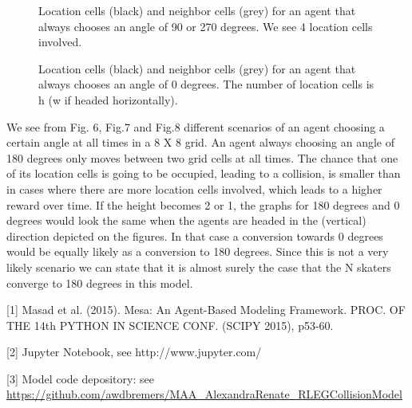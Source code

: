 \documentclass[a4paper]{article}
\begin{document}
\begin{figure}[h]
\caption{Location cells (black) and neighbor cells (grey) for an agent that always chooses an angle of 90 or 270 degrees. We see 4 location cells involved.} 
\end{figure}

\begin{figure}[h]
\caption{Location cells (black) and neighbor cells (grey) for an agent that always chooses an angle of 0 degrees. The number of location cells is h (w if headed horizontally).} 
\end{figure}

We see from Fig. 6, Fig.7 and Fig.8 different scenarios of an agent choosing a certain angle at all times in a 8 X 8 grid. An agent always choosing an angle of 180 degrees only moves between two grid cells at all times. The chance that one of its location cells is going to be occupied, leading to a collision, is smaller than in cases where there are more location cells involved, which leads to a higher reward over time.
If the height becomes 2 or 1, the graphs for 180 degrees and 0 degrees would look the same when the agents are headed in the (vertical) direction depicted on the figures. In that case a conversion towards 0 degrees would be equally likely as a conversion to 180 degrees. Since this is not a very likely scenario we can state that it is almost surely the case that the N skaters converge to 180 degrees in this model.





[1] Masad et al. (2015). Mesa: An Agent-Based Modeling Framework. PROC. OF THE 14th PYTHON IN SCIENCE CONF. (SCIPY 2015), p53-60.
\newline

[2] Jupyter Notebook, see http://www.jupyter.com/
\newline

[3] Model code depository: see 
\newline
\url{https://github.com/awdbremers/MAA_AlexandraRenate_RLEGCollisionModel}
\newline
\end{document}
